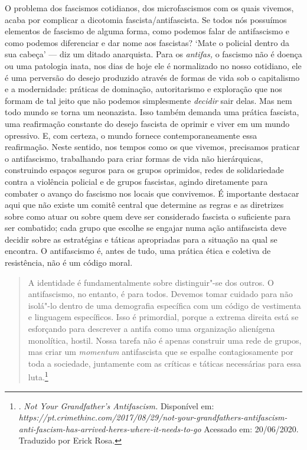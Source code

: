 O problema dos fascismos cotidianos, dos microfascismos com os quais
vivemos, acaba por complicar a dicotomia fascista/antifascista. Se todos
nós possuímos elementos de fascismo de alguma forma, como podemos falar
de antifascismo e como podemos diferenciar e dar nome aos fascistas?
`Mate o policial dentro da sua cabeça' --- diz um ditado anarquista. Para
os \emph{antifas,} o fascismo não é doença ou uma patologia inata, nos
dias de hoje ele é normalizado no nosso cotidiano, ele é uma perversão
do desejo produzido através de formas de vida sob o capitalismo e a
modernidade: práticas de dominação, autoritarismo e exploração que nos
formam de tal jeito que não podemos simplesmente \emph{decidir} sair
delas. Mas nem todo mundo se torna um neonazista. Isso também demanda
uma prática fascista, uma reafirmação constante do desejo fascista de
oprimir e viver em um mundo opressivo. E, com certeza, o mundo fornece
contemporaneamente essa reafirmação. Neste sentido, nos tempos como os
que vivemos, precisamos praticar o antifascismo, trabalhando para criar
formas de vida não hierárquicas, construindo espaços seguros para os
grupos oprimidos, redes de solidariedade contra a violência policial e
de grupos fascistas, agindo diretamente para combater o avanço do
fascismo nos locais que convivemos. É importante destacar aqui que não
existe um comitê central que determine as regras e as diretrizes sobre
como atuar ou sobre quem deve ser considerado fascista o suficiente para
ser combatido; cada grupo que escolhe se engajar numa ação antifascista
deve decidir sobre as estratégias e táticas apropriadas para a situação
na qual se encontra. O antifascismo é, antes de tudo, uma prática ética
e coletiva de resistência, não é um código moral.

\begin{quote}
A identidade é fundamentalmente sobre distinguir"-se dos outros. O
antifascismo, no entanto, é para todos. Devemos tomar cuidado para não
isolá"-lo dentro de uma demografia específica com um código de vestimenta
e linguagem específicos. Isso é primordial, porque a extrema direita
está se esforçando para descrever a antifa como uma organização
alienígena monolítica, hostil. Nossa tarefa não é apenas construir uma
rede de grupos, mas criar um \emph{momentum} antifascista que se espalhe
contagiosamente por toda a sociedade, juntamente com as críticas e
táticas necessárias para essa luta.\footnote{. \emph{Not
  Your Grandfather's Antifascism.} Disponível em:
  \emph{https://pt.crimethinc.com/2017/08/29/not-your-grandfathers-antifascism-anti-fascism-has-arrived-heres-where-it-needs-to-go}
  Acessado em: 20/06/2020. Traduzido por Erick Rosa.}
\end{quote}

